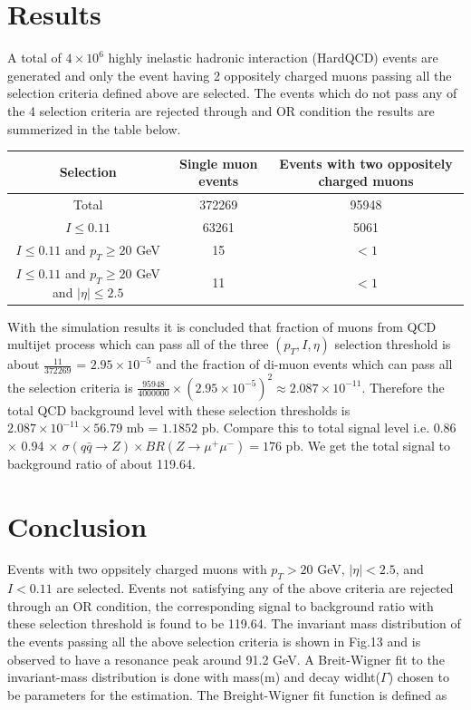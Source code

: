 \documentclass[12pt,a4paper]{article}		%
\begin{document}
\section{Results}

A total of $4 \times 10^6$ highly inelastic hadronic interaction (HardQCD) events are generated and only the event having 2 oppositely charged muons passing all the selection criteria  defined above are selected. The events which do not pass any of the 4 selection criteria are rejected through and OR condition the results are summerized in the table below. 

\begin{center}
	\begin{tabular}{|c|c|c|}
		\hline
		Selection & Single muon events & Events with two oppositely charged muons\\
		\hline
		Total & 372269 & 95948\\
		\hline
	     $I \le 0.11$ & 63261 & 5061\\
		\hline  
		$I \le 0.11$ and $p_T \ge 20$ GeV & 15 & $<1$\\
		\hline
		$I \le 0.11$ and $p_T \ge 20$ GeV and $|\eta| \le 2.5$ & 11 & $<1$\\
		\hline
	\end{tabular}
\end{center}

	With the simulation results it is concluded that fraction of muons from QCD multijet process which can pass all of the three $(p_T,I,\eta)$ selection threshold is about $\frac{11}{372269}$ = $2.95 \times 10^{-5}$ and the fraction of di-muon events which can pass all the selection criteria is $\frac{95948}{4000000} \times \left(2.95 \times 10^{-5} \right)^2 \approx 2.087 \times 10^{-11} $. Therefore the total QCD background level with these selection thresholds is $ 2.087 \times 10^{-11} \times 56.79$ mb = $ 1.1852$ pb. Compare this to total signal level i.e. 0.86 $\times$ 0.94 $\times$ $\sigma(q\bar{q} \to Z) \times BR(Z \to \mu^+\mu^-) = 176$ pb. We get the total signal to background ratio of about 119.64.     		

	

\section{Conclusion}

Events with two oppsitely charged muons with $p_T>20 $ GeV, $|\eta|<2.5$, and $I<0.11$ are selected. Events not satisfying any of the above criteria are rejected through an OR condition, the corresponding signal to background ratio with these selection threshold is found to be 119.64. The invariant mass distribution of the events passing all the above selection criteria is shown in Fig.13 and is observed to have a resonance peak around 91.2 GeV.
A Breit-Wigner fit to the invariant-mass distribution is done with mass(m) and decay widht($\Gamma$) chosen to be parameters for the estimation. The Breight-Wigner fit function is defined as 
\end{document}
